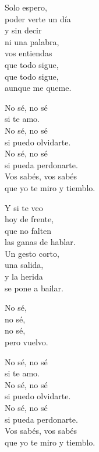 \begin{lyrics}
Solo espero,\\
poder verte un día\\
y sin decir\\
ni una palabra,\\
vos entiendas\\
que todo sigue,\\
que todo sigue,\\
aunque me queme.

No sé, no sé\\
si te amo.\\
No sé, no sé\\
si puedo olvidarte.\\
No sé, no sé\\
si pueda perdonarte.\\
Vos sabés, vos sabés\\
que yo te miro y tiemblo.

Y si te veo\\
hoy de frente,\\
que no falten\\
las ganas de hablar.\\
Un gesto corto,\\
una salida,\\
y la herida\\
se pone a bailar.

No sé,\\
no sé,\\
no sé,\\
pero vuelvo.

No sé, no sé\\
si te amo.\\
No sé, no sé\\
si puedo olvidarte.\\
No sé, no sé\\
si pueda perdonarte.\\
Vos sabés, vos sabés\\
que yo te miro y tiemblo.

\end{lyrics}

